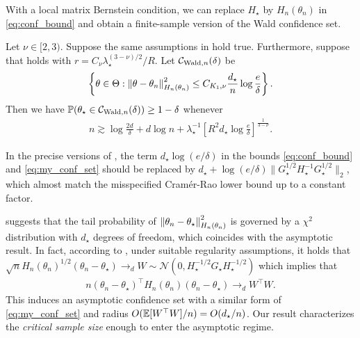 With a local matrix Bernstein condition, we can replace $H_\star$ by $H_n(\theta_n)$ in \eqref{eq:conf_bound} and obtain a finite-sample version of the Wald confidence set.
\begin{theorem}\label{thm:conf_set}
    Let $\nu \in [2, 3)$.
    Suppose the same assumptions in  hold true.
    Furthermore, suppose that  holds with $r = C_\nu \lambda_\star^{(3-\nu)/2} / R$.
    Let $\mathcal{C}_{\text{Wald}, n}(\delta)$ be
    \begin{align}\label{eq:my_conf_set}
        \left\{\theta \in \Theta: \left\lVert \theta - \theta_n \right\rVert_{H_n(\theta_n)}^2 \le C_{K_1,\nu} \frac{d_\star}{n} \log{\frac{e}{\delta}} \right\}.
    \end{align}
    Then we have $\operatorname{\mathbb P}(\theta_\star \in \mathcal{C}_{\text{Wald}, n}(\delta)) \ge 1 - \delta$ whenever
    \begin{align}\label{eq:n_large_enough}
        n \gtrsim \log{\frac{2d}{\delta}} + d\log{n} + \lambda_\star^{-1}\left[ R^2 d_\star \log{\frac{e}{\delta}} \right]^{\frac1{3-\nu}}.
    \end{align}
\end{theorem}

In the precise versions of , the term $d_\star \log{(e/\delta)}$ in the bounds \eqref{eq:conf_bound} and \eqref{eq:my_conf_set} should be replaced by $d_\star + \log{(e/\delta)} \lVert G_\star^{1/2} H_\star^{-1} G_\star^{1/2} \rVert_2$, which almost match the misspecified Cram\'er-Rao lower bound \citep[e.g.,][Thm.~1]{fortunati2016misspecified} up to a constant factor.

 suggests that the tail probability of $\left\lVert \theta_n - \theta_\star \right\rVert_{H_n(\theta_n)}^2$ is governed by a $\chi^2$ distribution with $d_\star$ degrees of freedom, which coincides with the asymptotic result.
In fact, according to \citet{huber1967under}, under suitable regularity assumptions, it holds that $\sqrt{n} H_n(\theta_n)^{1/2}(\theta_n - \theta_\star) \rightarrow_d W \sim \mathcal{N}(0, H_\star^{-1/2} G_\star H_\star^{-1/2})$ which implies that
\begin{align*}
    n(\theta_n - \theta_\star)^\top H_n(\theta_n) (\theta_n - \theta_\star) \rightarrow_d W^\top W.
\end{align*}
This induces an asymptotic confidence set with a similar form of \eqref{eq:my_conf_set} and radius $O(\operatorname{\mathbb E}[W^\top W] / n) = O(d_\star / n)$.
Our result characterizes the \emph{critical sample size} enough to enter the asymptotic regime.

